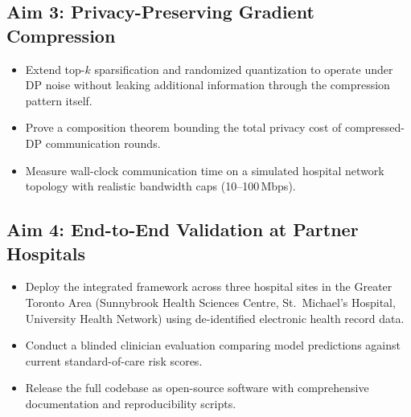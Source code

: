 \subsection{Aim 3: Privacy-Preserving Gradient Compression}
\vspace{-2pt}
\begin{itemize}
  \item Extend top-$k$ sparsification and randomized quantization to operate under DP noise
    without leaking additional information through the compression pattern itself.
  \item Prove a composition theorem bounding the total privacy cost of compressed-DP
    communication rounds.
  \item Measure wall-clock communication time on a simulated hospital network topology
    with realistic bandwidth caps (10--100\,Mbps).
\end{itemize}

\subsection{Aim 4: End-to-End Validation at Partner Hospitals}
\vspace{-2pt}
\begin{itemize}
  \item Deploy the integrated framework across three hospital sites in the Greater Toronto
    Area (Sunnybrook Health Sciences Centre, St.\ Michael's Hospital, University Health
    Network) using de-identified electronic health record data.
  \item Conduct a blinded clinician evaluation comparing model predictions against current
    standard-of-care risk scores.
  \item Release the full codebase as open-source software with comprehensive documentation
    and reproducibility scripts.
\end{itemize}

